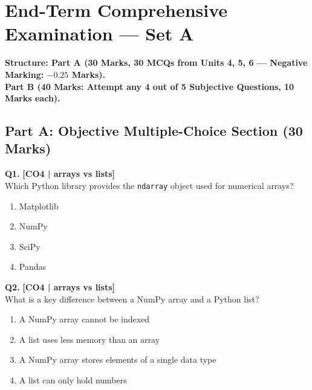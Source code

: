 \section{End-Term Comprehensive Examination --- Set A}


\begin{center}
\sffamily\textbf{\color{AlertRed}Structure: Part A (30 Marks, 30 MCQs from Units 4, 5, 6 --- Negative Marking: $-0.25$ Marks).}\\
\textbf{\color{AlertRed}Part B (40 Marks: Attempt any 4 out of 5 Subjective Questions, 10 Marks each).}
\end{center}
\vspace{{2mm}}

\subsection*{Part A: Objective Multiple-Choice Section (30 Marks)}

\noindent\textbf{Q1.} \hfill {\small\color{LPUOrange}\textbf{[CO4 | arrays vs lists]}}\\[2pt]
Which Python library provides the \texttt{ndarray} object used for numerical arrays?

\begin{enumerate}[label=(\alph*),topsep=2pt,itemsep=1pt,partopsep=0pt,parsep=0pt]
    \item \relax Matplotlib
    \item \relax NumPy
    \item \relax SciPy
    \item \relax Pandas
\end{enumerate}
\vspace{{2mm}}

\noindent\textbf{Q2.} \hfill {\small\color{LPUOrange}\textbf{[CO4 | arrays vs lists]}}\\[2pt]
What is a key difference between a NumPy array and a Python list?

\begin{enumerate}[label=(\alph*),topsep=2pt,itemsep=1pt,partopsep=0pt,parsep=0pt]
    \item \relax A NumPy array cannot be indexed
    \item \relax A list uses less memory than an array
    \item \relax A NumPy array stores elements of a single data type
    \item \relax A list can only hold numbers
\end{enumerate}
\vspace{{2mm}}

